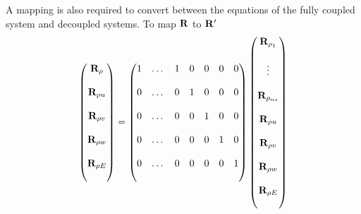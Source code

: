 \documentclass{article}   	%
\begin{document}
A mapping is also required to convert between the equations of the fully coupled
system and decoupled systems.  To map $\mathbf R$ to $\mathbf{R}'$
\begin{equation}
  \begin{pmatrix}
    \mathbf R_{\rho}      \\ \\
    \mathbf R_{\rho u}    \\ \\
		\mathbf R_{\rho v}    \\ \\
		\mathbf R_{\rho w}    \\ \\
		\mathbf R_{\rho E}    \\ \\
  \end{pmatrix} =
  \begin{pmatrix}
    1  &  \dots  &  1  &  0  &  0  &  0  &  0  \\ \\
    0  &  \dots  &  0  &  1  &  0  &  0  &  0  \\ \\
    0  &  \dots  &  0  &  0  &  1  &  0  &  0  \\ \\
    0  &  \dots  &  0  &  0  &  0  &  1  &  0  \\ \\
    0  &  \dots  &  0  &  0  &  0  &  0  &  1  \\ \\
  \end{pmatrix}
  \begin{pmatrix}
    \mathbf R_{\rho_1}    \\ \\
         \vdots     \\ \\
    \mathbf R_{\rho_{ns}} \\ \\
    \mathbf R_{\rho u}    \\ \\
		\mathbf R_{\rho v}    \\ \\
		\mathbf R_{\rho w}    \\ \\
		\mathbf R_{\rho E}    \\ \\
  \end{pmatrix}
  \label{R-map1}
\end{equation}
\end{document}
